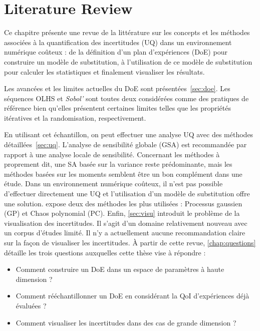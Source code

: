 \chapter{Literature Review}\label{chap:review}

\begin{chapquote}
Ce chapitre présente une revue de la littérature sur les concepts et les méthodes associées à la quantification des incertitudes (UQ) dans un environnement numérique coûteux : de la définition d'un plan d'expériences (DoE) pour construire un modèle de substitution, à l'utilisation de ce modèle de substitution pour calculer les statistiques et finalement visualiser les résultats.

Les avancées et les limites actuelles du DoE sont présentées~\cref{sec:doe}. Les séquences OLHS et \emph{Sobol'} sont toutes deux considérées comme des pratiques de référence bien qu'elles présentent certaines limites telles que les propriétés itératives et la randomisation, respectivement.

En utilisant cet échantillon, on peut effectuer une analyse UQ avec des méthodes détaillées~\cref{sec:uq}. L'analyse de sensibilité globale (GSA) est recommandée par rapport à une analyse locale de sensibilité. Concernant les méthodes à proprement dit, une SA basée sur la variance reste prédominante, mais les méthodes basées sur les moments semblent être un bon complément dans une étude. Dans un environnement numérique coûteux, il n'est pas possible d'effectuer directement une UQ et l'utilisation d'un modèle de substitution offre une solution.  expose deux des méthodes les plus utilisées : Processus gaussien (GP) et Chaos polynomial (PC). Enfin, \cref{sec:visu} introduit le problème de la visualisation des incertitudes. Il s'agit d'un domaine relativement nouveau avec un corpus d'études limité. Il n'y a actuellement aucune recommandation claire sur la façon de visualiser les incertitudes. À partir de cette revue, \cref{chap:questions} détaille les trois questions auxquelles cette thèse vise à répondre :
\begin{itemize}
\item Comment construire un DoE dans un espace de paramètres à haute dimension ?
\item Comment rééchantillonner un DoE en considérant la QoI d'expériences déjà évaluées ?
\item Comment visualiser les incertitudes dans des cas de grande dimension ?
\end{itemize}

\end{chapquote}

